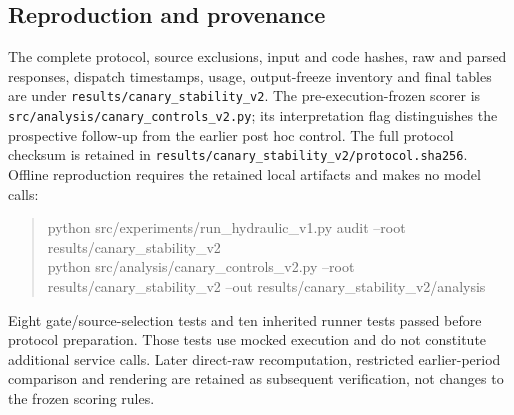 \subsection{Reproduction and provenance}
The complete protocol, source exclusions, input and code hashes, raw and parsed responses, dispatch timestamps, usage, output-freeze inventory and final tables are under \nolinkurl{results/canary_stability_v2}. The pre-execution-frozen scorer is \nolinkurl{src/analysis/canary_controls_v2.py}; its interpretation flag distinguishes the prospective follow-up from the earlier post hoc control. The full protocol checksum is retained in \nolinkurl{results/canary_stability_v2/protocol.sha256}. Offline reproduction requires the retained local artifacts and makes no model calls:
\begin{quote}\small\ttfamily\raggedright
python src/experiments/run\_hydraulic\_v1.py audit --root results/canary\_stability\_v2\\
python src/analysis/canary\_controls\_v2.py --root results/canary\_stability\_v2 --out results/canary\_stability\_v2/analysis
\end{quote}
Eight gate/source-selection tests and ten inherited runner tests passed before protocol preparation. Those tests use mocked execution and do not constitute additional service calls. Later direct-raw recomputation, restricted earlier-period comparison and rendering are retained as subsequent verification, not changes to the frozen scoring rules.
\FloatBarrier
